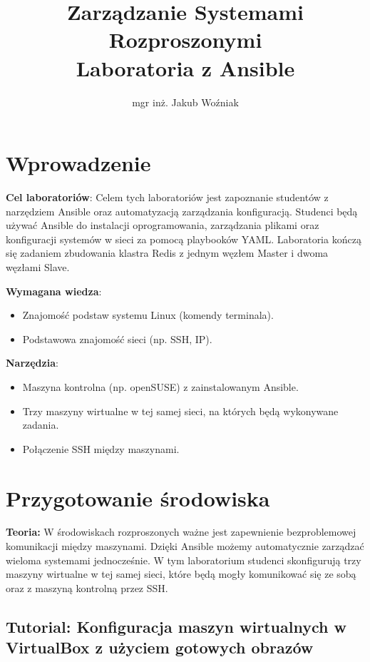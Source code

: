 \documentclass{article}
\title{Zarządzanie Systemami Rozproszonymi\\Laboratoria z Ansible}
\author{mgr inż. Jakub Woźniak}
\date{}
\begin{document}
\maketitle

\section*{Wprowadzenie}

\textbf{Cel laboratoriów}:  
Celem tych laboratoriów jest zapoznanie studentów z narzędziem Ansible oraz automatyzacją zarządzania konfiguracją. Studenci będą używać Ansible do instalacji oprogramowania, zarządzania plikami oraz konfiguracji systemów w sieci za pomocą playbooków YAML. Laboratoria kończą się zadaniem zbudowania klastra Redis z jednym węzłem Master i dwoma węzłami Slave.

\textbf{Wymagana wiedza}:  
\begin{itemize}
    \item Znajomość podstaw systemu Linux (komendy terminala).
    \item Podstawowa znajomość sieci (np. SSH, IP).
\end{itemize}

\textbf{Narzędzia}:  
\begin{itemize}
    \item Maszyna kontrolna (np. openSUSE) z zainstalowanym Ansible.
    \item Trzy maszyny wirtualne w tej samej sieci, na których będą wykonywane zadania.
    \item Połączenie SSH między maszynami.
\end{itemize}

\section{Przygotowanie środowiska}

\textbf{Teoria:}  
W środowiskach rozproszonych ważne jest zapewnienie bezproblemowej komunikacji między maszynami. Dzięki Ansible możemy automatycznie zarządzać wieloma systemami jednocześnie. W tym laboratorium studenci skonfigurują trzy maszyny wirtualne w tej samej sieci, które będą mogły komunikować się ze sobą oraz z maszyną kontrolną przez SSH.

\subsection*{Tutorial: Konfiguracja maszyn wirtualnych w VirtualBox z użyciem gotowych obrazów}
\end{document}
